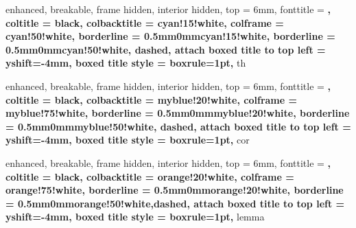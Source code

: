 \usepackage[american]{babel}
\usepackage{charter}
\usepackage{enumitem}
\usepackage{csquotes}
\usepackage[normalem]{ulem}
\usepackage{titlesec}
\usepackage{parskip}
\usepackage{microtype}

\usepackage{amsmath, amsfonts, amsthm, amssymb, mathtools}
\usepackage{siunitx}
\usepackage[makeroom]{cancel}
\usepackage{xfrac}
\usepackage[f]{esvect} %

\usepackage[dvipsnames]{xcolor}
\usepackage{fancyhdr}
\usepackage[margin=2cm]{geometry}
\usepackage{tikz}
\usepackage[most,many,breakable]{tcolorbox}
\usepackage{caption}
\usepackage{subcaption}
\usepackage{booktabs}
\usepackage{float}
\usepackage{listings}
\usepackage[numbered]{matlab-prettifier}

\usepackage{varwidth}

\usepackage{hyperref,theoremref}

\setlength{\parindent}{0pt}



{%
	enhanced,
	breakable,
	frame hidden,
  interior hidden,
  top = 6mm,
  fonttitle = \bfseries,
	coltitle = black,
  colbacktitle = cyan!15!white,
  colframe = cyan!50!white,
  borderline = {0.5mm}{0mm}{cyan!15!white},
  borderline = {0.5mm}{0mm}{cyan!50!white, dashed},
  attach boxed title to top left = {yshift=-4mm},
  boxed title style = {boxrule=1pt},
}{th}

{%
	enhanced,
	breakable,
	frame hidden,
	interior hidden,
	top = 6mm,
	fonttitle = \bfseries,
	coltitle = black,
	colbacktitle = myblue!20!white,
	colframe = myblue!75!white,
	borderline = {0.5mm}{0mm}{myblue!20!white},
	borderline = {0.5mm}{0mm}{myblue!50!white, dashed},
	attach boxed title to top left = {yshift=-4mm},
	boxed title style = {boxrule=1pt},
}{cor}

{%
	enhanced,
	breakable,
	frame hidden,
	interior hidden,
	top = 6mm,
	fonttitle = \bfseries,
	coltitle = black,
	colbacktitle = orange!20!white,
	colframe = orange!75!white,
	borderline = {0.5mm}{0mm}{orange!20!white},
	borderline = {0.5mm}{0mm}{orange!50!white,dashed},
	attach boxed title to top left = {yshift=-4mm},
	boxed title style = {boxrule=1pt},
}{lemma}

